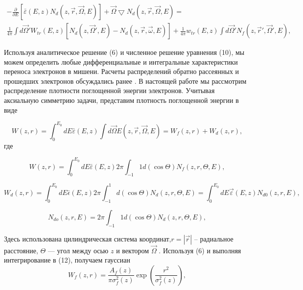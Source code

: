 \begin{gather}
-\frac{\partial}{\partial E}[\bar{\varepsilon}(E,z)N_d(z,\vec{r},\vec{\Omega},E)]+\vec{\Omega} \bigtriangledown N_d (z,\vec{r},\vec{\Omega},E)= \nonumber \\
\frac{1}{4\pi} \int d\vec{\Omega}'W_{tr}(E,z)[N_d(z,\vec{\Omega}',E)-N_d(z,\vec{r},\vec{\omega},E)]+\frac{1}{4\pi}w_{tr}(E,z) \int d\vec{\Omega}'N_f(z,\vec{r}',\vec{\Omega}',E),
\label{eq:10}
\end{gather}


Используя аналитическое решение (6) и численное решение уравнения (10), мы
можем определить любые дифференциальные и интегральные характеристики переноса
электронов в мишени. Расчеты распределений обратно рассеянных и прошедших
электронов обсуждались ранее \cite{smolar}. В настоящей работе мы рассмотрим распределение
плотности поглощенной энергии электронов.
Учитывая аксиальную симметрию задачи, представим плотность поглощенной
энергии в виде

\begin{equation}
W(z,r)=\int_{0}^{E_0} dE\bar{\varepsilon}(E,z) \int d\vec{\Omega}E(z,\vec{r},\vec{\Omega},E)=W_f(z,r)+W_d(z,r),
\label{eq:11}
\end{equation}
где

\begin{equation}
W(z,r)=\int_{0}^{E_0} dE\bar{\varepsilon}(E,z)2\pi \int_{-1}{1} d(\cos \Theta)N_f(z,r,\Theta ,E),
\label{eq:12}
\end{equation}

\begin{equation}
W_{d}(z,r)=\int_{0}^{E_0} dE\bar{\epsilon}(E,z)2\pi \int_{-1}^{1} d(\cos \Theta)N_d(z,r,\Theta ,E)=\int_{0}^{E_0}dE\vec{\varepsilon}(E,z)N_{d0}(z,r,E),
\label{eq:13}
\end{equation}

\begin{equation}
N_{do}(z,r,E)=2\pi \int_{-1}{1} d(\cos \Theta)N_d(z,r,\Theta,E),
\label{eq:14}
\end{equation}

Здесь использована цилиндрическая система координат,$r=|\vec{r}|$ -- радиальное
расстояние, $\Theta$ — угол между осью $z$ и вектором $\vec{\Omega}$ .
Используя (6) и выполняя интегрирование в (12), получаем гауссиан
\begin{equation}
W_f(z,r)=\frac{A_f(z)}{\pi \sigma_f^2(z)} \exp \left(\frac{r^2}{\sigma_f^2(z)}\right),
\label{eq:15}
\end{equation}


